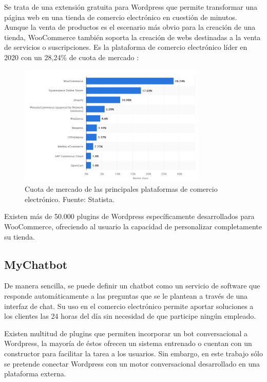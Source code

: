 Se trata de una extensión gratuita para Wordpress que permite transformar una página web en una tienda de comercio electrónico en cuestión de minutos. Aunque la venta de productos es el escenario más obvio para la creación de una tienda, WooCommerce también soporta la creación de webs destinadas a la venta de servicios o suscripciones. 
Es la plataforma de comercio electrónico líder en 2020 con un 28,24\% de cuota de mercado :

\begin{figure}[ht]
	\begin{center}
		\includegraphics[width = 0.80\textwidth]{Figuras/eCommerceMarketShare.PNG}
	\end{center}
	\caption{\label{fig:WooCommerce} Cuota de mercado de las principales plataformas de comercio electrónico. Fuente: Statista.}
\end{figure}

Existen más de 50.000 plugins de Wordpress específicamente desarrollados para WooCommerce, ofreciendo al usuario la capacidad de personalizar completamente su tienda.

\subsection{MyChatbot}

De manera sencilla, se puede definir un chatbot como un servicio de software que responde automáticamente a las preguntas que se le plantean a través de una interfaz de chat. Su uso en el comercio electrónico permite aportar soluciones a los clientes las 24 horas del día sin necesidad de que participe ningún empleado.

Existen multitud de plugins que permiten incorporar un bot conversacional a Wordpress,  la mayoría de éstos ofrecen un sistema entrenado o cuentan con un constructor para facilitar la tarea a los usuarios. Sin embargo, en este trabajo sólo se pretende conectar Wordpress con un motor conversacional desarrollado en una plataforma externa.

